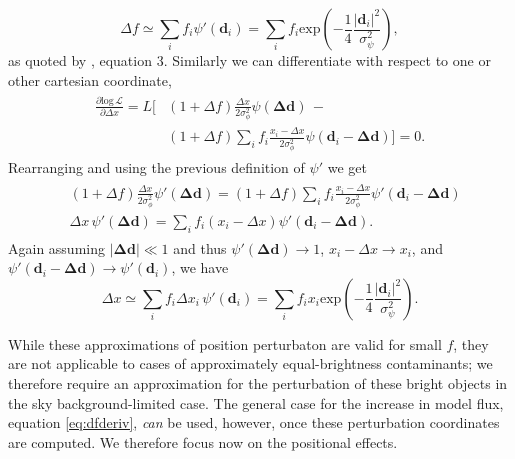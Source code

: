\documentclass[fleqn,usenatbib]{mnras}
\begin{document}
\begin{equation}
    \Delta f \simeq \sum\limits_if_i\psi{'}(\mathbf{d}_i) = \sum\limits_if_i\mathrm{exp}\left(-\frac{1}{4}\frac{\lvert\mathbf{d}_i\lvert^2}{\sigma_\psi^2}\right),
\end{equation}
as quoted by \citet{2018MNRAS.476.4372}, equation 3. Similarly we can differentiate with respect to one or other cartesian coordinate,
\begin{align}
\begin{split}
    \frac{\partial\mathrm{log}\,\mathcal{L}}{\partial \Delta x} = L \bigg[&(1 + \Delta f)\frac{\Delta x}{2\sigma_\phi^2}\psi(\mathbf{\Delta d})\,-\\&(1 + \Delta f)\sum\limits_if_i\frac{x_i - \Delta x}{2\sigma_\phi^2}\psi(\mathbf{d}_i - \mathbf{\Delta d})\Bigg] = 0.
\end{split}
\end{align}
Rearranging and using the previous definition of $\psi{'}$ we get
\begin{align}
\begin{split}
    &(1 + \Delta f)\frac{\Delta x}{2\sigma_\phi^2}\psi{'}(\mathbf{\Delta d}) = (1 + \Delta f)\sum\limits_if_i\frac{x_i - \Delta x}{2\sigma_\phi^2}\psi{'}(\mathbf{d}_i - \mathbf{\Delta d})\\
    &\Delta x\,\psi{'}(\mathbf{\Delta d}) = \sum\limits_if_i(x_i - \Delta x)\psi{'}(\mathbf{d}_i - \mathbf{\Delta d}).
\label{eq:dxderiv}
\end{split}
\end{align}
Again assuming $\lvert\mathbf{\Delta d}\lvert \ll 1$ and thus $\psi{'}(\mathbf{\Delta d}) \to 1$, $x_i - \Delta x \to x_i$, and $\psi{'}(\mathbf{d}_i - \mathbf{\Delta d}) \to \psi{'}(\mathbf{d}_i)$, we have
\begin{equation}
    \Delta x \simeq \sum\limits_if_i\Delta x_i\,\psi{'}(\mathbf{d}_i) = \sum\limits_if_ix_i\mathrm{exp}\left(-\frac{1}{4}\frac{\lvert\mathbf{d}_i\lvert^2}{\sigma_\psi^2}\right).
\label{eq:dxderivsmall}
\end{equation}

While these approximations of position perturbaton are valid for small $f$, they are not applicable to cases of approximately equal-brightness contaminants; we therefore require an approximation for the perturbation of these bright objects in the sky background-limited case. The general case for the increase in model flux, equation \ref{eq:dfderiv}, \textit{can} be used, however, once these perturbation coordinates are computed. We therefore focus now on the positional effects.
\end{document}

